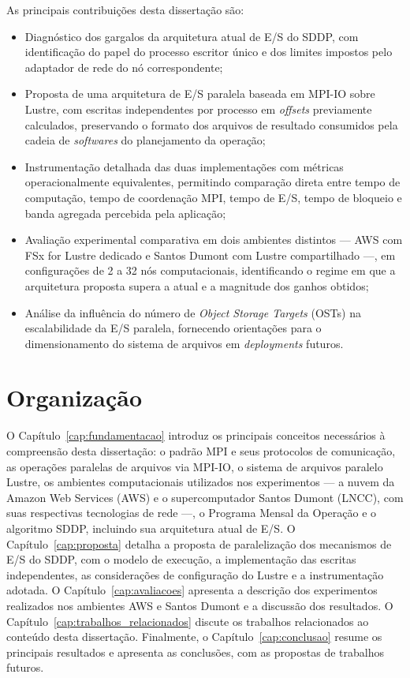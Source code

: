 As principais contribuições desta dissertação são:
\begin{itemize}
  \item Diagnóstico dos gargalos da arquitetura atual de E/S do
        SDDP, com identificação do papel do processo escritor
        único e dos limites impostos pelo adaptador de rede do nó
        correspondente;

  \item Proposta de uma arquitetura de E/S paralela baseada em
        MPI-IO sobre Lustre, com escritas independentes por
        processo em \textit{offsets} previamente calculados,
        preservando o formato dos arquivos de resultado consumidos
        pela cadeia de \textit{softwares} do planejamento da
        operação;

  \item Instrumentação detalhada das duas implementações com
        métricas operacionalmente equivalentes, permitindo
        comparação direta entre tempo de computação, tempo de
        coordenação MPI, tempo de E/S, tempo de bloqueio e banda
        agregada percebida pela aplicação;

  \item Avaliação experimental comparativa em dois ambientes
        distintos --- AWS com FSx for Lustre dedicado e Santos
        Dumont com Lustre compartilhado ---, em configurações de
        2 a 32 nós computacionais, identificando o regime em que
        a arquitetura proposta supera a atual e a magnitude dos
        ganhos obtidos;

  \item Análise da influência do número de \textit{Object Storage
        Targets} (OSTs) na escalabilidade da E/S paralela,
        fornecendo orientações para o dimensionamento do sistema
        de arquivos em \textit{deployments} futuros.
\end{itemize}

\section{Organização}

O Capítulo~\ref{cap:fundamentacao} introduz os principais
conceitos necessários à compreensão desta dissertação: o padrão
MPI e seus protocolos de comunicação, as operações paralelas de
arquivos via MPI-IO, o sistema de arquivos paralelo Lustre, os
ambientes computacionais utilizados nos experimentos --- a nuvem
da Amazon Web Services (AWS) e o supercomputador Santos Dumont
(LNCC), com suas respectivas tecnologias de rede ---, o Programa
Mensal da Operação e o algoritmo SDDP, incluindo sua arquitetura
atual de E/S. O
Capítulo~\ref{cap:proposta} detalha a proposta de
paralelização dos mecanismos de E/S do SDDP, com o modelo de
execução, a implementação das escritas independentes, as
considerações de configuração do Lustre e a instrumentação
adotada. O Capítulo~\ref{cap:avaliacoes} apresenta a descrição dos
experimentos realizados nos ambientes AWS e Santos Dumont e a discussão
dos resultados. O
Capítulo~\ref{cap:trabalhos_relacionados} discute os
trabalhos relacionados ao conteúdo desta dissertação.
Finalmente, o Capítulo~\ref{cap:conclusao} resume os
principais resultados e apresenta as conclusões, com as
propostas de trabalhos futuros.

